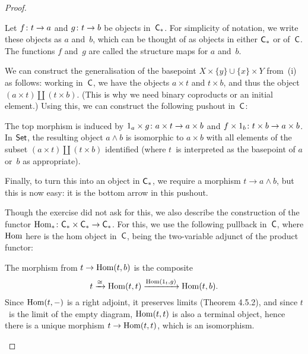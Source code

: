 \documentclass[../../solutions]{subfiles}
\begin{document}
\begin{proof}
\begin{enumerate}[label=(\roman*)]
    Let ${f}\colon{t}\to{a}$ and ${g}\colon{t}\to{b}$ be objects in~${\mathsf{C}}_*$.
    For simplicity of notation, we write these objects as $a$ and~$b$,
    which can be thought of as objects in either ${\mathsf{C}}_*$ or of~${\mathsf{C}}$.
    The functions $f$ and~$g$ are called the structure maps for $a$
    and~$b$.

    We can construct the generalisation of the basepoint
    $X\times\{y\}\cup \{x\}\times Y$ from~(i) as follows: working
    in~${\mathsf{C}}$, we have the objects $a\times t$ and $t\times b$, and
    thus the object $(a\times t)\coprod(t\times b)$.  (This is why we
    need binary coproducts or an initial element.)  Using this, we can
    construct the following pushout in~${\mathsf{C}}$:
    \begin{center}
    \end{center}
    The top morphism is induced by
    ${1_a\times g}\colon{a\times t}\to{a\times b}$ and
    ${f\times 1_b}\colon{t\times b}\to{a\times b}$.  In $\mathsf{Set}$, the
    resulting object $a\wedge b$ is isomorphic to $a\times b$ with all
    elements of the subset $(a\times t)\coprod(t\times b)$ identified
    (where $t$~is interpreted as the basepoint of $a$ or~$b$ as
    appropriate).

    Finally, to turn this into an object in ${\mathsf{C}}_*$, we require a
    morphism $t\to a\wedge b$, but this is now easy: it is the bottom
    arrow in this pushout.

    Though the exercise did not ask for this, we also describe the
    construction of the functor
    ${\operatorname{Hom}_*}\colon{{\mathsf{C}}_*\times{\mathsf{C}}_*}\to{{\mathsf{C}}_*}$.  For this, we use the
    following pullback in~${\mathsf{C}}$, where $\operatorname{Hom}$ here is the hom object
    in~${\mathsf{C}}$, being the two-variable adjunct of the product functor:
    \begin{center}
    \end{center}
    The morphism from $t\to\operatorname{Hom}(t,b)$ is the composite
    $$t\xrightarrow{\cong} \operatorname{Hom}(t,t) \xrightarrow{\operatorname{Hom}(1_t,g)}
    \operatorname{Hom}(t,b).$$
    Since $\operatorname{Hom}(t,-)$ is a right adjoint, it preserves limits (Theorem
    4.5.2), and since $t$~is the limit of the empty diagram,
    $\operatorname{Hom}(t,t)$ is also a terminal object, hence there is a unique
    morphism $t\to \operatorname{Hom}(t,t)$, which is an isomorphism.


\end{enumerate}
\end{proof}
\end{document}
